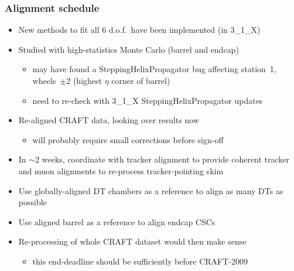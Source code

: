 \documentclass[compress]{beamer}
\begin{document}
\begin{frame}
\frametitle{Alignment schedule}

\begin{itemize}
\item New methods to fit all 6 d.o.f.\ have been implemented (in 3\_1\_X)
\item Studied with high-statistics Monte Carlo (barrel and endcap)
\begin{itemize}
\item may have found a SteppingHelixPropagator bug affecting station~1, wheels~$\pm$2 (highest $\eta$ corner of barrel)
\item need to re-check with 3\_1\_X SteppingHelixPropagator updates
\end{itemize}
\item Re-aligned CRAFT data, looking over results now
\begin{itemize}
\item will probably require small corrections before sign-off
\end{itemize}
\item In $\sim$2 weeks, coordinate with tracker alignment to provide coherent tracker and muon alignments to re-process tracker-pointing skim
\item Use globally-aligned DT chambers as a reference to align as many DTs as possible
\item Use aligned barrel as a reference to align endcap CSCs
\item Re-processing of whole CRAFT dataset would then make sense
\begin{itemize}
\item this end-deadline should be sufficiently before CRAFT-2009
\end{itemize}
\end{itemize}

\end{frame}


\end{document}
